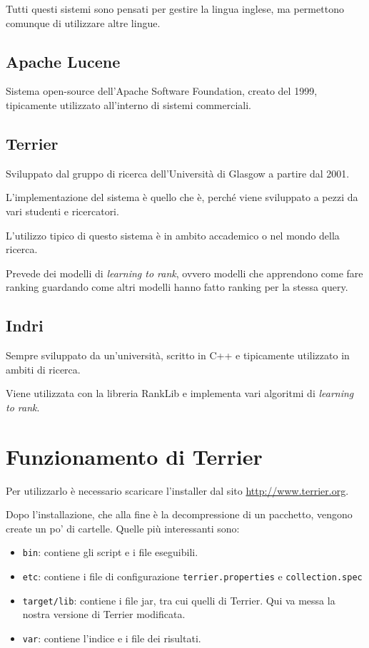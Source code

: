 \noindent Tutti questi sistemi sono pensati per gestire la lingua inglese, ma permettono comunque di utilizzare altre lingue.


\subsection{Apache Lucene}

Sistema open-source dell'Apache Software Foundation, creato del 1999, tipicamente utilizzato all'interno di sistemi commerciali.

\subsection{Terrier}

Sviluppato dal gruppo di ricerca dell'Università di Glasgow a partire dal 2001.

L'implementazione del sistema è quello che è, perché viene sviluppato a pezzi da vari studenti e ricercatori.

L'utilizzo tipico di questo sistema è in ambito accademico o nel mondo della ricerca.

Prevede dei modelli di \textit{learning to rank}, ovvero modelli che apprendono come fare ranking guardando come altri modelli hanno fatto ranking per la stessa query. 

\subsection{Indri}

Sempre sviluppato da un'università, scritto in C++ e tipicamente utilizzato in ambiti di ricerca.

Viene utilizzata con la libreria RankLib e  implementa vari algoritmi di \textit{learning to rank}.

\section{Funzionamento di Terrier}

Per utilizzarlo è necessario scaricare l'installer dal sito \url{http://www.terrier.org}.

Dopo l'installazione, che alla fine è la decompressione di un pacchetto, vengono create un po' di cartelle. Quelle più interessanti sono:

\begin{itemize}
	\item \texttt{bin}: contiene gli script e i file eseguibili.
	\item \texttt{etc}: contiene i file di configurazione \texttt{terrier.properties} e \texttt{collection.spec}
	\item \texttt{target/lib}: contiene i file jar, tra cui quelli di Terrier. Qui va messa la nostra versione di Terrier modificata.
	\item \texttt{var}: contiene l'indice e i file dei risultati.
\end{itemize}



